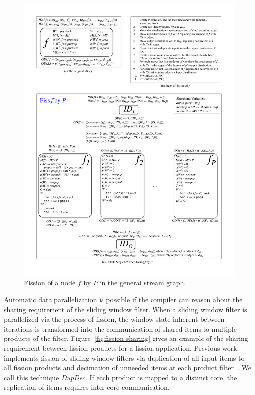 \begin{figure}
\centering
\includegraphics[width=\textwidth]{figures/general-fission.pdf}
\caption[Fission of a node in the general stream graph.]{Fission of a
  node $f$ by $P$ in the general stream
  graph.\label{fig:general-fission}}
\end{figure}


Automatic data parallelization is possible if the compiler can reason
about the sharing requirement of the sliding window filter.  When a
sliding window filter is parallelized via the process of fission, the
window state inherent between iterations is transformed into the
communication of shared items to multiple products of the filter.
Figure~\ref{fig:fission-sharing} gives an example of the sharing
requirement between fission products for a fission application.
Previous work implements fission of sliding window filters via
duplication of all input items to all fission products and decimation
of unneeded items at each product filter~\cite{streamit-asplos}.  We
call this technique {\it DupDec}. If each product is mapped to a
distinct core, the replication of items requires inter-core
communication.

